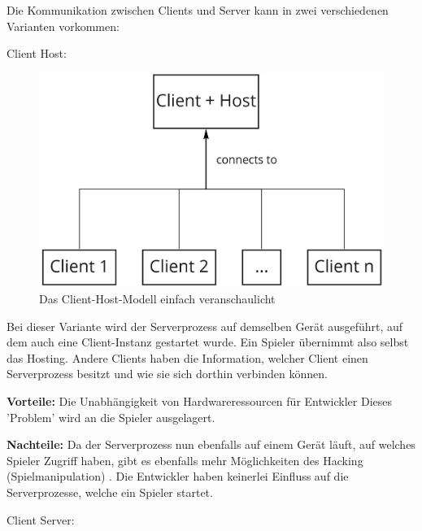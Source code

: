 Die Kommunikation zwischen Clients und Server kann in zwei verschiedenen Varianten vorkommen:

\textsf{\Large Client Host:}

\begin{figure}[H]
	\centering
	\includegraphics[width=150mm]{images/Client_Host.jpg}
	\caption[Client-Server Modell]{Das Client-Host-Modell einfach veranschaulicht}
	\label{pic:Client_Host}
\end{figure}

Bei dieser Variante wird der Serverprozess auf demselben Gerät ausgeführt, auf dem auch eine Client-Instanz gestartet wurde. Ein Spieler übernimmt also selbst das Hosting. Andere Clients haben die Information, welcher Client einen Serverprozess besitzt und wie sie sich dorthin verbinden können. 

\textbf{Vorteile:} Die Unabhängigkeit von Hardwareressourcen für Entwickler Dieses 'Problem' wird an die Spieler ausgelagert. 

\textbf{Nachteile:} Da der Serverprozess nun ebenfalls auf einem Gerät läuft, auf welches Spieler Zugriff haben, gibt es ebenfalls mehr Möglichkeiten des Hacking (Spielmanipulation) \cite{Wikipedia.2021h}. Die Entwickler haben keinerlei Einfluss auf die Serverprozesse, welche ein Spieler startet.
\cite{Smed.2002}

\newpage
\textsf{\Large Client Server:}

